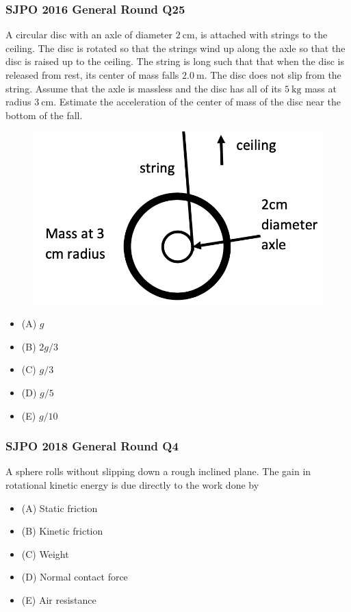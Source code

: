 \documentclass{article}
\begin{document}
\subsubsection{SJPO 2016 General Round Q25}
A circular disc with an axle of diameter $2 \mathrm{~cm}$, is attached with strings to the ceiling. The disc is rotated so that the strings wind up along the axle so that the disc is raised up to the ceiling. The string is long such that that when the disc is released from rest, its center of mass falls $2.0 \mathrm{~m}$. The disc does not slip from the string. Assume that the axle is massless and the disc has all of its $5 \mathrm{~kg}$ mass at radius $3 \mathrm{~cm}$. Estimate the acceleration of the center of mass of the disc near the bottom of the fall. \\
{
\begin{figure} 
\includegraphics[width=\linewidth]{images/sjpo2016q25.png}
\end{figure}
\begin{itemize}
\item[](A) $g$
\item[](B) $2 g / 3$
\item[](C) $g / 3$
\item[](D) $g / 5$
\item[](E) $g / 10$
\end{itemize}
}
\subsubsection{SJPO 2018 General Round Q4}
A sphere rolls without slipping down a rough inclined plane. The gain in rotational kinetic energy is due directly to the work done by
\begin{itemize}
\item[](A) Static friction
\item[](B) Kinetic friction
\item[](C) Weight
\item[](D) Normal contact force
\item[](E) Air resistance
\end{itemize}
\end{document}
